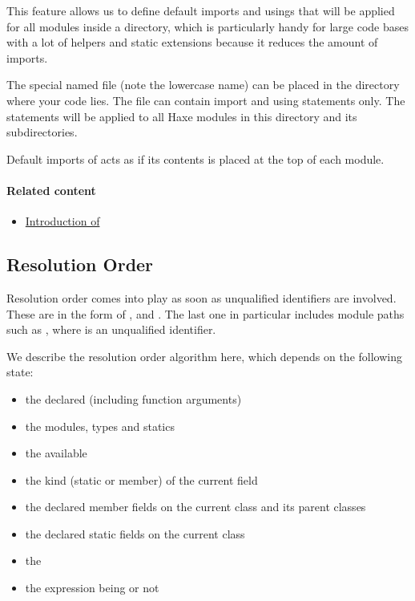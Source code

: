 This feature allows us to define default imports and usings that will be applied for all modules inside a directory, which is particularly handy for large code bases with a lot of helpers and static extensions because it reduces the amount of imports.

The special named  file (note the lowercase name) can be placed in the directory where your code lies. The file can contain import and using statements only. The statements will be applied to all Haxe modules in this directory and its subdirectories.

Default imports of  acts as if its contents is placed at the top of each module. 

\paragraph{Related content}
\begin{itemize}
	\item \href{https://haxe.org/blog/importhx-intro/}{Introduction of }
\end{itemize}




\subsection{Resolution Order}
\label{type-system-resolution-order}

Resolution order comes into play as soon as unqualified identifiers are involved. These are  in the form of ,  and . The last one in particular includes module paths such as , where  is an unqualified identifier.  

We describe the resolution order algorithm here, which depends on the following state:

\begin{itemize}
	\item the declared  (including function arguments)
	\item the  modules, types and statics
	\item the available 
	\item the kind (static or member) of the current field
	\item the declared member fields on the current class and its parent classes
	\item the declared static fields on the current class
	\item the 
	\item the expression being  or not
\end{itemize}

